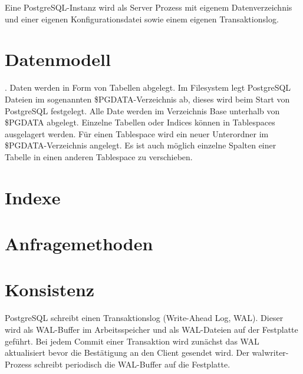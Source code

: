Eine PostgreSQL-Instanz wird als Server Prozess mit eigenem Datenverzeichnis und einer eigenen Konfigurationsdatei sowie einem eigenen Transaktionslog.
\section{Datenmodell}
. Daten werden in Form von Tabellen abgelegt. Im Filesystem legt PostgreSQL Dateien im sogenannten \$PGDATA-Verzeichnis ab, dieses wird beim Start von PostgreSQL festgelegt. Alle Date werden im Verzeichnis Base unterhalb von \$PGDATA abgelegt. Einzelne Tabellen oder Indices können in Tablespaces ausgelagert werden. Für einen Tablespace wird ein neuer Unterordner im \$PGDATA-Verzeichnis angelegt. Es ist auch möglich einzelne Spalten einer Tabelle in einen anderen Tablespace zu verschieben.
\section{Indexe}
\section{Anfragemethoden}
\section{Konsistenz}
PostgreSQL schreibt einen Transaktionslog (Write-Ahead Log, WAL).
Dieser wird als WAL-Buffer im Arbeitsspeicher und als WAL-Dateien auf der Festplatte geführt.
Bei jedem Commit einer Transaktion wird zunächst das WAL aktualisiert bevor die Bestätigung an den Client gesendet wird.
Der walwriter-Prozess schreibt periodisch die WAL-Buffer auf die Festplatte.
